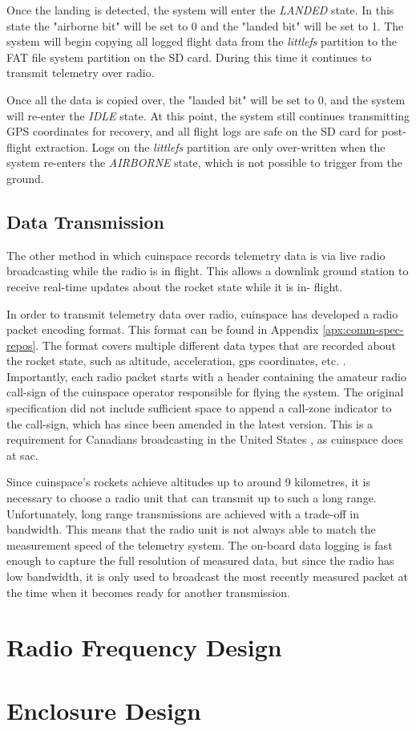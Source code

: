 Once the landing is detected, the system will enter the \textit{LANDED} state. In this state the "airborne bit" will be
set to 0 and the "landed bit" will be set to 1. The system will begin copying all logged flight data from the
\textit{littlefs} partition to the FAT file system partition on the SD card. During this time it continues to transmit
telemetry over radio.

Once all the data is copied over, the "landed bit" will be set to 0, and the system will re-enter the \textit{IDLE}
state. At this point, the system still continues transmitting GPS coordinates for recovery, and all flight logs are
safe on the SD card for post-flight extraction. Logs on the \textit{littlefs} partition are only over-written when the
system re-enters the \textit{AIRBORNE} state, which is not possible to trigger from the ground.

\subsection{Data Transmission}

The other method in which \gls{cuinspace} records telemetry data is via live radio broadcasting while the radio is in
flight. This allows a downlink ground station to receive real-time updates about the rocket state while it is in-
flight.

In order to transmit telemetry data over radio, \gls{cuinspace} has developed a radio packet encoding format. This
format can be found in Appendix \ref{apx:comm-spec-repos}. The format covers multiple different data types that are
recorded about the rocket state, such as altitude, acceleration, \gls{gps} coordinates, etc. \cite{radio-comms}.
Importantly, each radio packet starts with a header containing the amateur radio call-sign of the \gls{cuinspace}
operator responsible for flying the system. \cite{radio-comms} The original specification did not include sufficient
space to append a call-zone indicator to the call-sign, which has since been amended in the latest version. This is a
requirement for Canadians broadcasting in the United States \cite{foreign-broadcast}, as \gls{cuinspace} does at
\gls{sac}.

Since \gls{cuinspace}'s rockets achieve altitudes up to around 9 kilometres, it is necessary to choose a radio unit
that can transmit up to such a long range. Unfortunately, long range transmissions are achieved with a trade-off in
bandwidth. This means that the radio unit is not always able to match the measurement speed of the telemetry system.
The on-board data logging is fast enough to capture the full resolution of measured data, but since the radio has low
bandwidth, it is only used to broadcast the most recently measured packet at the time when it becomes ready for another
transmission.

\section{Radio Frequency Design}


\section{Enclosure Design}

